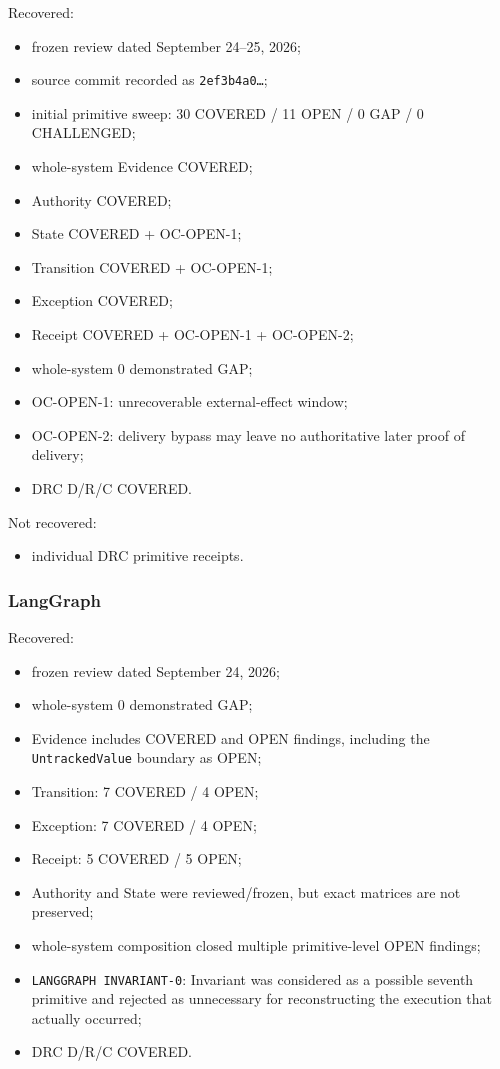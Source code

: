 \documentclass[11pt]{article}
\begin{document}
Recovered:

\begin{itemize}
\item frozen review dated September 24--25, 2026;
\item source commit recorded as \texttt{2ef3b4a0…};
\item initial primitive sweep: 30 COVERED / 11 OPEN / 0 GAP / 0 CHALLENGED;
\item whole-system Evidence COVERED;
\item Authority COVERED;
\item State COVERED + OC-OPEN-1;
\item Transition COVERED + OC-OPEN-1;
\item Exception COVERED;
\item Receipt COVERED + OC-OPEN-1 + OC-OPEN-2;
\item whole-system 0 demonstrated GAP;
\item OC-OPEN-1: unrecoverable external-effect window;
\item OC-OPEN-2: delivery bypass may leave no authoritative later proof of delivery;
\item DRC D/R/C COVERED.
\end{itemize}

Not recovered:

\begin{itemize}
\item individual DRC primitive receipts.
\end{itemize}

\subsubsection{LangGraph}

Recovered:

\begin{itemize}
\item frozen review dated September 24, 2026;
\item whole-system 0 demonstrated GAP;
\item Evidence includes COVERED and OPEN findings, including the \texttt{UntrackedValue} boundary as OPEN;
\item Transition: 7 COVERED / 4 OPEN;
\item Exception: 7 COVERED / 4 OPEN;
\item Receipt: 5 COVERED / 5 OPEN;
\item Authority and State were reviewed/frozen, but exact matrices are not preserved;
\item whole-system composition closed multiple primitive-level OPEN findings;
\item \texttt{LANGGRAPH INVARIANT-0}: Invariant was considered as a possible seventh primitive and rejected as unnecessary for reconstructing the execution that actually occurred;
\item DRC D/R/C COVERED.
\end{itemize}
\end{document}
